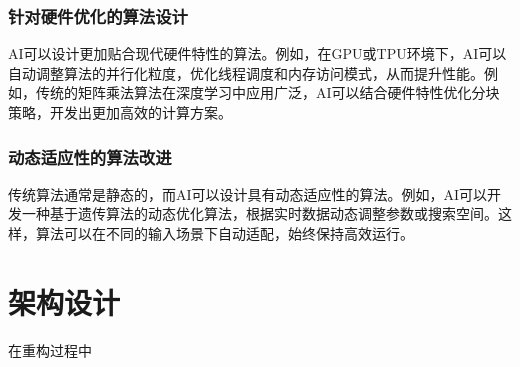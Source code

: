 \documentclass[supercite]{HustGraduPaper}
\begin{document}
	\subsubsection{\songti \bfseries 针对硬件优化的算法设计}
	AI可以设计更加贴合现代硬件特性的算法。例如，在GPU或TPU环境下，AI可以自动调整算法的并行化粒度，优化线程调度和内存访问模式，从而提升性能。例如，传统的矩阵乘法算法在深度学习中应用广泛，AI可以结合硬件特性优化分块策略，开发出更加高效的计算方案。
	\subsubsection{\songti \bfseries 动态适应性的算法改进}
	传统算法通常是静态的，而AI可以设计具有动态适应性的算法。例如，AI可以开发一种基于遗传算法的动态优化算法，根据实时数据动态调整参数或搜索空间。这样，算法可以在不同的输入场景下自动适配，始终保持高效运行。

	\section{架构设计}
	在重构过程中
	
	
	
	
	
	
	
	
	
	
\end{document}

